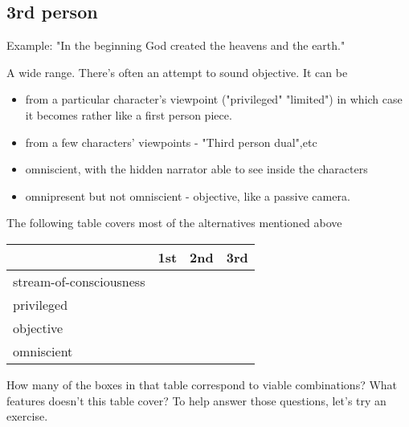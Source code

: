 \documentclass[11pt]{article}
\begin{document}
\subsection*{3rd person}
Example: "In the beginning God created the heavens and the earth." 


A wide range. There's often an attempt to sound objective. It can be


\begin{itemize} 
\item from a particular character's viewpoint ("privileged" "limited") in which case it becomes rather like a first person piece.
\item from a few characters' viewpoints - "Third person dual",etc 
\item omniscient, with the hidden narrator able to see inside the characters
\item omnipresent but not omniscient - objective, like a passive camera.
\end{itemize}

The following table covers most of the alternatives mentioned above

 \begin{tabular}{|l|l|l|l|}\hline
& 1st & 2nd & 3rd\\\hline
stream-of-consciousness &  & & \\\hline
privileged &  & & \\\hline
objective &  & & \\\hline
omniscient &  & & \\\hline
\end{tabular}

How many of the boxes in that table correspond to viable combinations? What features doesn't this table cover? To help answer those questions, let's try an exercise.
\end{document}

